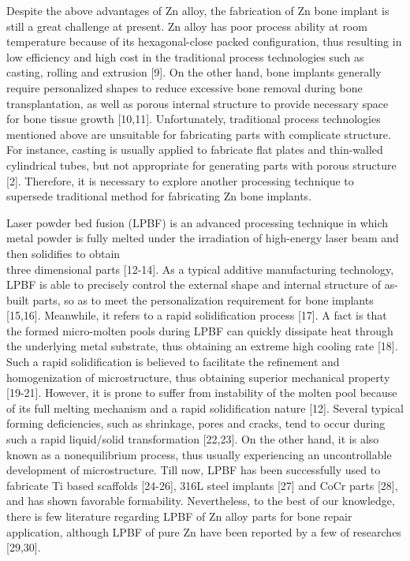\documentclass[10pt]{article}
\begin{document}
Despite the above advantages of $\mathrm{Zn}$ alloy, the fabrication of $\mathrm{Zn}$ bone implant is still a great challenge at present. $\mathrm{Zn}$ alloy has poor process ability at room temperature because of its hexagonal-close packed configuration, thus resulting in low efficiency and high cost in the traditional process technologies such as casting, rolling and extrusion [9]. On the other hand, bone implants generally require personalized shapes to reduce excessive bone removal during bone transplantation, as well as porous internal structure to provide necessary space for bone tissue growth [10,11]. Unfortunately, traditional process technologies mentioned above are unsuitable for fabricating parts with complicate structure. For instance, casting is usually applied to fabricate flat plates and thin-walled cylindrical tubes, but not appropriate for generating parts with porous structure [2]. Therefore, it is necessary to explore another processing technique to supersede traditional method for fabricating $\mathrm{Zn}$ bone implants.

Laser powder bed fusion (LPBF) is an advanced processing technique in which metal powder is fully melted under the irradiation of high-energy laser beam and then solidifies to obtain\\
three dimensional parts [12-14]. As a typical additive manufacturing technology, LPBF is able to precisely control the external shape and internal structure of as-built parts, so as to meet the personalization requirement for bone implants [15,16]. Meanwhile, it refers to a rapid solidification process [17]. A fact is that the formed micro-molten pools during LPBF can quickly dissipate heat through the underlying metal substrate, thus obtaining an extreme high cooling rate [18]. Such a rapid solidification is believed to facilitate the refinement and homogenization of microstructure, thus obtaining superior mechanical property [19-21]. However, it is prone to suffer from instability of the molten pool because of its full melting mechanism and a rapid solidification nature [12]. Several typical forming deficiencies, such as shrinkage, pores and cracks, tend to occur during such a rapid liquid/solid transformation [22,23]. On the other hand, it is also known as a nonequilibrium process, thus usually experiencing an uncontrollable development of microstructure. Till now, LPBF has been successfully used to fabricate Ti based scaffolds [24-26], 316L steel implants [27] and CoCr parts [28], and has shown favorable formability. Nevertheless, to the best of our knowledge, there is few literature regarding LPBF of Zn alloy parts for bone repair application, although LPBF of pure Zn have been reported by a few of researches [29,30].
\end{document}
